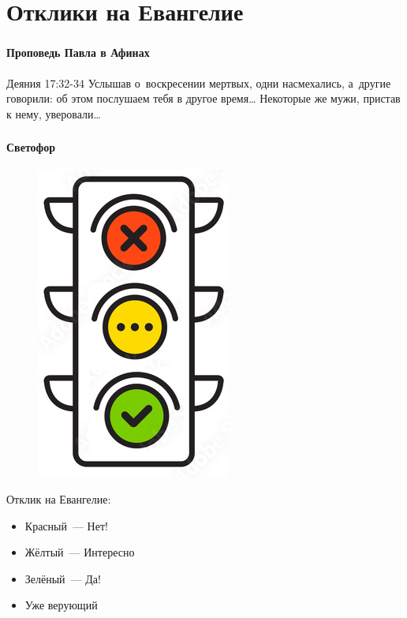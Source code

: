 \documentclass[t,aspectratio=169,14pt]{beamer}  %
\begin{document}
\section{Отклики на Евангелие}
\begin{frame}[c]
	\frametitle{\insertsection}
	\framesubtitle{Проповедь Павла в Афинах}
	\begin{block}{Деяния 17:32-34}
		Услышав о~воскресении мертвых,\linebreak
		\hphantom{M}одни насмехались,\linebreak
		\hphantom{M}а~другие говорили: об этом послушаем тебя в другое время\ldots \linebreak
		\hphantom{M}Некоторые же мужи, пристав к нему, уверовали\ldots
	\end{block}	
\end{frame}	
\begin{frame}[c]
	\frametitle{\insertsection}
	\framesubtitle{Светофор}

	\begin{multicols*}{2}

		\begin{figure}[h]
		\includegraphics[height=0.4\textheight]{svetofor.png}
		\end{figure}
		\columnbreak

		Отклик на Евангелие:
		\begin{itemize}
			\item Красный~--- Нет!
			\item Жёлтый~--- Интересно
			\item Зелёный~--- Да!
			\item Уже верующий
		\end{itemize}	
	\end{multicols*}
\end{frame}
\end{document}
